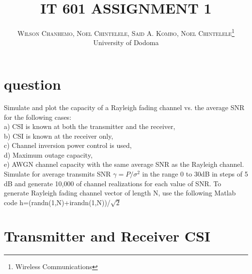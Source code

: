 \documentclass{article}
\title{\vspace{-15mm}\fontsize{24pt}{10pt}\selectfont\textbf{IT 601 ASSIGNMENT 1}} %
\author{
\large
\textsc{Wilson Chanhemo, Noel Chintelele, Said A. Kombo, Noel Chintelele}\thanks{Wireless Communications}\\[2mm] %
\normalsize University of Dodoma \\ %
\vspace{-5mm}
}
\date{}
\begin{document}
\maketitle %

\thispagestyle{fancy} %



\section{question}
Simulate and plot the capacity of a Rayleigh fading channel vs. the average SNR for the following cases:\\
a)	CSI is known at both the transmitter and the receiver,\\
b)	CSI is known at the receiver only,\\
c)	Channel inversion power control is used,\\
d)	Maximum outage capacity,\\
e)	AWGN channel capacity with the same average SNR as the Rayleigh channel.\\

Simulate for average transmits SNR $\gamma=P/\sigma^2$   in the range 0 to 30dB in steps of 5 dB and generate 10,000 of channel realizations for each value of SNR. To generate Rayleigh fading channel vector of length N, use the following Matlab code  h=(randn(1,N)+irandn(1,N))/$\sqrt{2}$


\section{Transmitter and Receiver CSI}
\end{document}
